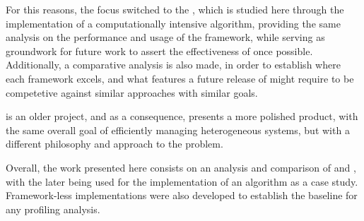 \documentclass[main.tex]{subfiles}
\begin{document}
 For this reasons, the focus switched to the \starpu, which is studied here through the implementation of a computationally intensive algorithm, providing the same analysis on the performance and usage of the framework, while serving as groundwork for future work to assert the effectiveness of \gama once possible. Additionally, a comparative analysis is also made, in order to establish where each framework excels, and what features a future release of \gama might require to be competetive against similar approaches with similar goals.

\starpu is an older project, and as a consequence, presents a more polished product, with the same overall goal of efficiently managing heterogeneous systems, but with a different philosophy and approach to the problem.

Overall, the work presented here consists on an analysis and comparison of \gama and \starpu, with the later being used for the implementation of an algorithm as a case study. Framework-less implementations were also developed to establish the baseline for any profiling analysis.

\end{document}
